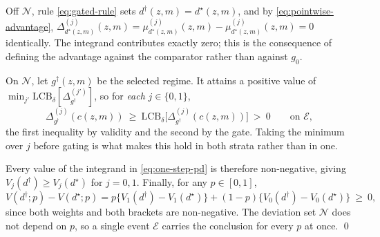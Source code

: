 Off $\mathcal N$, rule \eqref{eq:gated-rule} sets $d^\dagger(z,m)=d^\star(z,m)$,
and by \eqref{eq:pointwise-advantage},
$\Delta^{(j)}_{d^\star(z,m)}(z,m)=\mu^{(j)}_{d^\star(z,m)}(z,m)-
\mu^{(j)}_{d^\star(z,m)}(z,m)=0$ identically.  The integrand contributes
exactly zero; this is the consequence of defining the advantage against the
comparator rather than against $g_0$.

On $\mathcal N$, let $g^\dagger(z,m)$ be the selected regime.  It attains a
positive value of $\min_{j'}\mathrm{LCB}_\delta[\Delta^{(j')}_{g^\dagger}]$, so
for \emph{each} $j\in\{0,1\}$,
\begin{equation}
 \Delta^{(j)}_{g^\dagger}(c(z,m))\ \ge\ \mathrm{LCB}_\delta\big[\Delta^{(j)}_{g^\dagger}(c(z,m))\big]\ >\ 0
 \qquad\text{on }\mathcal E,
\end{equation}
the first inequality by validity and the second by the gate.  Taking the
minimum over $j$ before gating is what makes this hold in both strata rather
than in one.

Every value of the integrand in \eqref{eq:one-step-pd} is therefore
non-negative, giving $V_j(d^\dagger)\ge V_j(d^\star)$ for $j=0,1$.  Finally, for
any $p\in[0,1]$,
\begin{equation}
 V(d^\dagger;p)-V(d^\star;p)
 =p\big\{V_1(d^\dagger)-V_1(d^\star)\big\}+(1-p)\big\{V_0(d^\dagger)-V_0(d^\star)\big\}\ \ge\ 0,
\end{equation}
since both weights and both brackets are non-negative.  The deviation set
$\mathcal N$ does not depend on $p$, so a single event $\mathcal E$ carries the
conclusion for every $p$ at once. \qed

